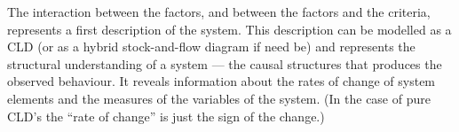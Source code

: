 The interaction between the factors, and between the factors and the
criteria, represents a first description of the system.
%
This description can be modelled as a \acl{CLD} (or as a hybrid stock-and-flow
diagram if need be) and represents the structural understanding of a system ---
the causal structures that produces the observed behaviour.
%
It reveals information about the rates of change of system elements
and the measures of the variables of the system.
%
(In the case of pure \ac{CLD}'s the ``rate of change'' is just the
sign of the change.)


